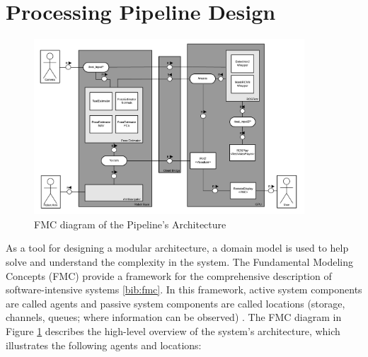 \section{Processing Pipeline Design}\label{chap:3:architecture}
\begin{figure}[!ht]
        \centering
        \includegraphics[width=0.9\textwidth]{images/cow_fmc.png}
        \caption{FMC diagram of the Pipeline's Architecture}
        \label{fig:cow_fmc}
    \end{figure}
As a tool for designing a modular architecture, a domain model is used to help solve and understand the complexity in the system. The Fundamental Modeling Concepts (FMC) provide a framework for the comprehensive description of software-intensive systems \ref{bib:fmc}. 
In this framework, active system components are called agents and passive system components are called locations (storage, channels, queues; where information can be observed) \cite{FMCdiag}. The FMC diagram in Figure \ref{fig:cow_fmc} describes the high-level overview of the system's architecture, which illustrates the following agents and locations:
